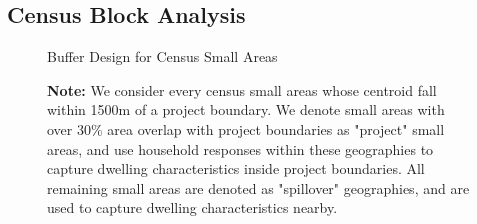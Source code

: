 \documentclass[12pt]{article}
\begin{document}
\subsection{Census Block Analysis}

\begin{figure}
\caption{Buffer Design for Census Small Areas}\label{figure:bufferdesigncensus}
\centering
{}
\vspace{2mm}
\caption*{\footnotesize {\bf Note:} We consider every census small areas whose centroid fall within 1500m of a project boundary. We denote small areas with over 30\% area overlap with project boundaries as "project" small areas, and use household responses within these geographies to capture dwelling characteristics inside project boundaries. All remaining small areas are denoted as "spillover" geographies, and are used to capture dwelling characteristics nearby.}
\end{figure}
\end{document}
